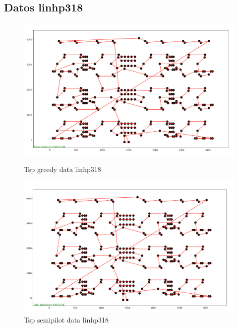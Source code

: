 \documentclass{article}
\begin{document}
\subsection{Datos linhp318}

\begin{figure}[H]
	\begin{minipage}{0.5\textwidth}
		\centering
		\includegraphics[width=1\textwidth]{../../image/greedy/greedy-linhp318.png}
		\caption{\label{fig:Figura1} Tsp greedy data linhp318}
	\end{minipage}\hfill
	\begin {minipage}{0.5\textwidth}
	\centering
	\includegraphics[width=1\textwidth]{../../image/semipilot/semipilot-linhp318-2-2.png}
	\caption{\label{fig:Figura1} Tsp semipilot data linhp318}
\end{minipage}
\end{figure}
\end{document}
